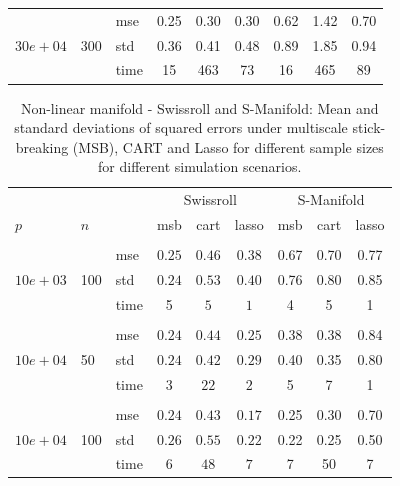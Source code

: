 \documentclass{article} %
\begin{document}
\begin{table}[t]
\begin{center}
\begin{small}
\begin{sc}
\begin{tabular}{lllcccccc}
\\
\multirow{3}{*}{$30e+04$}&\multirow{3}{*}{300}&mse&0.25&0.30&0.30&0.62&1.42&0.70\\
&&std &0.36&0.41&0.48&0.89&1.85&0.94\\
&&time &15&463&73&16&465&89\\

\hline
\end{tabular}
\end{sc}
\end{small}
\end{center}
\vskip -0.1in
\end{table}



\begin{table}[t]
\caption{Non-linear manifold - Swissroll and S-Manifold: Mean and standard deviations of squared errors under multiscale stick-breaking (MSB), CART and Lasso for different sample sizes for different simulation scenarios.}\label{table:swiss}
\vskip 0.15in
\begin{center}
\begin{small}
\begin{sc}
\begin{tabular}{lllcccccc}
\hline
&&&\multicolumn{3}{c}{Swissroll}&\multicolumn{3}{c}{S-Manifold}\\

$p$&$n$& & msb&cart& lasso & msb&cart& lasso\\
\\
\multirow{3}{*}{$10e+03$}&\multirow{3}{*}{100}&mse &$0.25$&$0.46$&$0.38$&0.67&0.70&0.77\\
&&std & $0.24$ & $0.53$&$0.40$&0.76&0.80&0.85\\
&&time & 5& $5$&$1$&4 & 5 & 1 \\

\\
\multirow{3}{*}{$10e+04$}&\multirow{3}{*}{50}&mse &$0.24$&$0.44$&$0.25$&0.38&0.38&0.84\\
&&std & $0.24$ & $0.42$&$0.29$&0.40&0.35&0.80\\
&&time & 3 & $22$&$2$ &5&7&1\\

\\
\multirow{3}{*}{$10e+04$}&\multirow{3}{*}{100}&mse &$0.24$ & $0.43$&$0.17$&0.25&0.30&0.70\\
&&std & $0.26$&$0.55$&$0.22$&0.22 & 0.25 &0.50\\
&&time&$6$&$48$&$7$&7 & 50 & 7\\


\end{tabular}
\end{sc}
\end{small}
\end{center}
\end{table}
\end{document}
